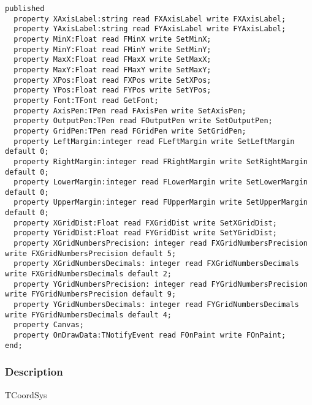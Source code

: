 \documentclass[12pt,a4paper,oneside]{report}
\begin{document}
\begin{verbatim}
published                                    
  property XAxisLabel:string read FXAxisLabel write FXAxisLabel;
  property YAxisLabel:string read FYAxisLabel write FYAxisLabel;
  property MinX:Float read FMinX write SetMinX; 
  property MinY:Float read FMinY write SetMinY;
  property MaxX:Float read FMaxX write SetMaxX;
  property MaxY:Float read FMaxY write SetMaxY;
  property XPos:Float read FXPos write SetXPos;
  property YPos:Float read FYPos write SetYPos;
  property Font:TFont read GetFont;
  property AxisPen:TPen read FAxisPen write SetAxisPen;
  property OutputPen:TPen read FOutputPen write SetOutputPen;
  property GridPen:TPen read FGridPen write SetGridPen;
  property LeftMargin:integer read FLeftMargin write SetLeftMargin default 0;
  property RightMargin:integer read FRightMargin write SetRightMargin default 0;
  property LowerMargin:integer read FLowerMargin write SetLowerMargin default 0;
  property UpperMargin:integer read FUpperMargin write SetUpperMargin default 0;
  property XGridDist:Float read FXGridDist write SetXGridDist;
  property YGridDist:Float read FYGridDist write SetYGridDist;
  property XGridNumbersPrecision: integer read FXGridNumbersPrecision write FXGridNumbersPrecision default 5;
  property XGridNumbersDecimals: integer read FXGridNumbersDecimals write FXGridNumbersDecimals default 2;
  property YGridNumbersPrecision: integer read FYGridNumbersPrecision write FYGridNumbersPrecision default 9;
  property YGridNumbersDecimals: integer read FYGridNumbersDecimals write FYGridNumbersDecimals default 4;
  property Canvas;
  property OnDrawData:TNotifyEvent read FOnPaint write FOnPaint;
end;
\end{verbatim}
\subsubsection{Description}
TCoordSys
\end{document}

